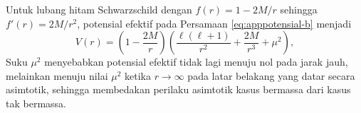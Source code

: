 Untuk lubang hitam Schwarzschild dengan $f(r) = 1 - 2M/r$ sehingga $f'(r) = 2M/r^2$,
potensial efektif pada Persamaan \eqref{eq:apppotensial-b} menjadi
\begin{equation}
    V(r) = \left( 1 - \frac{2M}{r} \right)
    \left( \frac{\ell(\ell+1)}{r^2} + \frac{2M}{r^3} + \mu^2 \right),
    \label{eq:apppotensial-schwarzschild-b}
\end{equation}
Suku $\mu^2$ menyebabkan potensial efektif tidak lagi menuju nol pada jarak jauh,
melainkan menuju nilai $\mu^2$ ketika $r \to \infty$ pada latar belakang yang datar
secara asimtotik, sehingga membedakan perilaku asimtotik kasus bermassa dari kasus
tak bermassa.